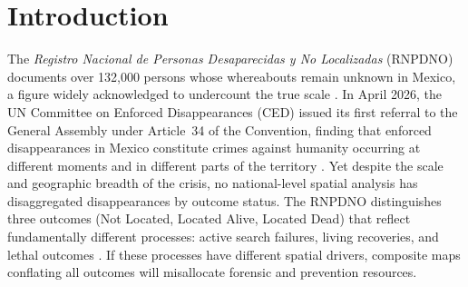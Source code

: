 \section{Introduction}
\label{sec:intro}

The \textit{Registro Nacional de Personas Desaparecidas y No Localizadas} (RNPDNO) documents over 132,000 persons whose whereabouts remain unknown in Mexico, a figure widely acknowledged to undercount the true scale \citep{guercke_2025}.
In April 2026, the UN Committee on Enforced Disappearances (CED) issued its first referral to the General Assembly under Article~34 of the Convention, finding that enforced disappearances in Mexico constitute crimes against humanity occurring at different moments and in different parts of the territory \citep{CED_MEX_art34_2026}.
Yet despite the scale and geographic breadth of the crisis, no national-level spatial analysis has disaggregated disappearances by outcome status.
The RNPDNO distinguishes three outcomes (Not Located, Located Alive, Located Dead) that reflect fundamentally different processes: active search failures, living recoveries, and lethal outcomes \cite{cruz-santiago_lists_2020}.
If these processes have different spatial drivers, composite maps conflating all outcomes will misallocate forensic and prevention resources.

